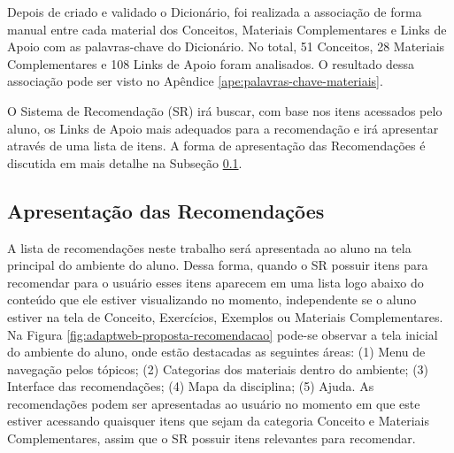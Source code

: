 Depois de criado e validado o Dicionário, foi realizada a associação de forma manual entre cada material dos Conceitos,
Materiais Complementares e Links de Apoio com as palavras-chave do Dicionário. No total, 51 Conceitos, 28 Materiais
Complementares e 108 Links de Apoio foram analisados. O resultado dessa associação pode ser visto no Apêndice \ref{ape:palavras-chave-materiais}.

O Sistema de Recomendação (SR) irá buscar, com base nos itens acessados pelo aluno, os Links de Apoio mais adequados
para a recomendação e irá apresentar através de uma lista de itens. A forma de apresentação das Recomendações é discutida
em mais detalhe na Subseção \ref{subsection:apresentacao-recomendacoes}.

\subsection{Apresentação das Recomendações}\label{subsection:apresentacao-recomendacoes}

A lista de recomendações neste trabalho será apresentada ao aluno na tela principal do ambiente do aluno. Dessa forma,
quando o SR possuir itens para recomendar para o usuário esses itens aparecem em uma lista logo abaixo do conteúdo que
ele estiver visualizando no momento, independente se o aluno estiver na tela de Conceito, Exercícios, Exemplos ou
Materiais Complementares. Na Figura \ref{fig:adaptweb-proposta-recomendacao} pode-se observar a tela inicial do ambiente do
aluno, onde estão destacadas as seguintes áreas: (1) Menu de navegação pelos tópicos; (2) Categorias dos materiais dentro
do ambiente; (3) Interface das recomendações; (4) Mapa da disciplina; (5) Ajuda. As recomendações podem ser apresentadas ao usuário no momento em que este estiver acessando
quaisquer itens que sejam da categoria Conceito e Materiais Complementares, assim que o SR possuir itens relevantes para recomendar.

